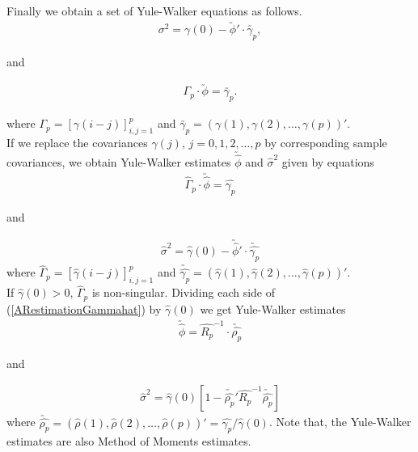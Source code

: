\documentclass[11pt, a4paper]{article}
\numberwithin{equation}{section}
\theoremstyle{definition}
\begin{document}
Finally we obtain a set of Yule-Walker equations as follows.
\begin{align}
\sigma^2 = \gamma(0) - \utilde{\phi}' \cdot \utilde{\gamma_p},
\end{align}
\begin{center}and\end{center}
\begin{align}\label{AR_p_phi_Yule_Walker}
\Gamma_p \cdot \utilde{\phi} = \utilde{\gamma_p}.
\end{align}

where $\Gamma_p = \left[ \gamma(i - j) \right]_{i, j = 1}^{p}$ and $\utilde{\gamma_p} = \left( \gamma(1), \gamma(2), \ldots, \gamma(p) \right)'$. \\[0.1em]

If we replace the covariances $\gamma(j), \, j = 0, 1, 2, \ldots, p$ by corresponding sample covariances, we obtain Yule-Walker estimates $\utilde{\hat{\phi}}$ and $\hat{\sigma}^2$ given by equations
\begin{align}\label{ARestimationGammahat}
\widehat{\Gamma}_p \cdot \utilde{\hat{\phi}} = \hat{\gamma_p}
\end{align}
\begin{center}and\end{center}
\begin{align}
\hat{\sigma}^2 = \hat{\gamma}(0) - \utilde{\hat{\phi}}' \cdot \utilde{\hat{\gamma_p}}
\end{align}
where $\widehat{\Gamma}_p = \left[ \hat{\gamma}(i - j) \right]_{i, j = 1}^{p}$ and $\utilde{\hat{\gamma_p}} = \left( \hat{\gamma}(1), \hat{\gamma}(2), \ldots, \hat{\gamma}(p) \right)'$. \\[0.1em]

If $\hat{\gamma}(0) > 0$, $\widehat{\Gamma}_p$ is non-singular. Dividing each side of (\ref{ARestimationGammahat}) by $\hat{\gamma}(0)$ we get Yule-Walker estimates
\begin{align}
\utilde{\hat{\phi}} = \widehat{R_p}^{-1} \cdot \utilde{\hat{\rho_p}}
\end{align}
\begin{center}and\end{center}
\begin{align}
\hat{\sigma}^2 = \hat{\gamma}(0) \left[ 1 - \utilde{\hat{\rho_p}}' \widehat{R_p}^{-1} \utilde{\hat{\rho_p}} \right]
\end{align}
where $\utilde{\hat{\rho_p}} = \left( \hat{\rho}(1), \hat{\rho}(2), \ldots, \hat{\rho}(p) \right)' = \hat{\gamma_p} / \hat{\gamma}(0)$. Note that, the Yule-Walker estimates are also Method of Moments estimates.
\end{document}
